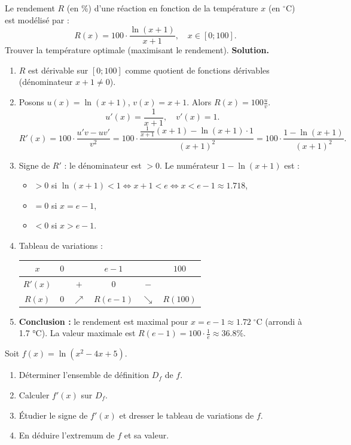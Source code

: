 \documentclass[11pt]{article}
\newcommand{\cle}[1]{{\popxbold\color{popdark}#1}}
\begin{document}
\begin{exoresolu}
Le rendement $R$ (en \%) d'une réaction en fonction de la température $x$ (en $^\circ$C) est modélisé par :
\[
R(x) = 100 \cdot \frac{\ln(x+1)}{x+1}, \quad x \in [0; 100].
\]
Trouver la température optimale (maximisant le rendement).
\vspace{0,5em}
\noindent\textbf{Solution.}
\begin{enumerate}
\item $R$ est dérivable sur $[0;100]$ comme quotient de fonctions dérivables (dénominateur $x+1 \neq 0$).
\item Posons $u(x) = \ln(x+1)$, $v(x) = x+1$. Alors $R(x) = 100 \frac{u}{v}$.
\[
u'(x) = \frac{1}{x+1}, \quad v'(x) = 1.
\]
\[
R'(x) = 100 \cdot \frac{u'v - uv'}{v^2} = 100 \cdot \frac{\frac{1}{x+1}(x+1) - \ln(x+1)\cdot 1}{(x+1)^2} = 100 \cdot \frac{1 - \ln(x+1)}{(x+1)^2}.
\]
\item Signe de $R'$ : le dénominateur est $>0$. Le numérateur $1 - \ln(x+1)$ est :
\begin{itemize}
\item $>0$ si $\ln(x+1) < 1 \iff x+1 < e \iff x < e-1 \approx \num{1,718}$,
\item $=0$ si $x = e-1$,
\item $<0$ si $x > e-1$.
\end{itemize}
\item Tableau de variations :
\begin{center}
\begin{tabular}{|c|ccccc|}\hline
$x$ & $0$ & & $e-1$ & & $100$ \\ \hline
$R'(x)$ & & $+$ & $0$ & $-$ & \\ \hline
$R(x)$ & $0$ & $\nearrow$ & $R(e-1)$ & $\searrow$ & $R(100)$ \\ \hline
\end{tabular}
\end{center}
\item \textbf{Conclusion :} le rendement est maximal pour $x = e-1 \approx \num{1,72}\;^\circ\text{C}$ (arrondi à \num{1,7} °C). La valeur maximale est $R(e-1) = 100 \cdot \frac{1}{e} \approx \num{36,8}\%$.
\end{enumerate}
\end{exoresolu}

\begin{exercice}
Soit $f(x) = \ln(x^2 - 4x + 5)$.
\begin{enumerate}
\item Déterminer l'ensemble de définition $D_f$ de $f$.
\item Calculer $f'(x)$ sur $D_f$.
\item Étudier le signe de $f'(x)$ et dresser le \cle{tableau de variations} de $f$.
\item En déduire l'extremum de $f$ et sa valeur.
\end{enumerate}
\end{exercice}
\end{document}

